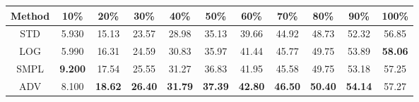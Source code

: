 \documentclass{standalone}
\begin{document}
\begin{tabular}{c|cccccccccc}
      \toprule
      Method & 10\% & 20\% & 30\% & 40\% & 50\% & 60\% & 70\% & 80\% & 90\% & 100\% \\
      \midrule
STD & 5.930 & 15.13 & 23.57 & 28.98 & 35.13 & 39.66 & 44.92 & 48.73 & 52.32 & 56.85\\
LOG & 5.990 & 16.31 & 24.59 & 30.83 & 35.97 & 41.44 & 45.77 & 49.75 & 53.89 & \textbf{58.06}\\
SMPL & \textbf{9.200} & 17.54 & 25.55 & 31.27 & 36.83 & 41.95 & 45.58 & 49.75 & 53.18 & 57.25\\
ADV & 8.100 & \textbf{18.62} & \textbf{26.40} & \textbf{31.79} & \textbf{37.39} & \textbf{42.80} & \textbf{46.50} & \textbf{50.40} & \textbf{54.14} & 57.27\\
  \bottomrule
\end{tabular}
\end{document}
